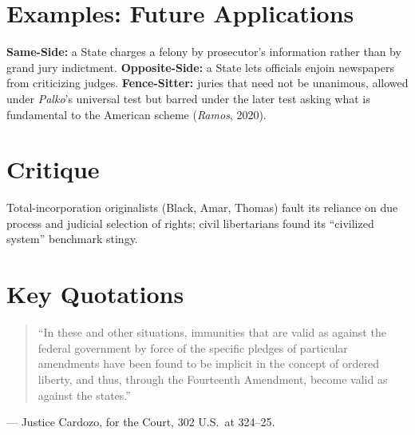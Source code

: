 \documentclass[12pt]{article}
\begin{document}
\section{Examples: Future Applications}
\textbf{Same-Side:} a State charges a felony by prosecutor's information rather than by grand jury indictment. \textbf{Opposite-Side:} a State lets officials enjoin newspapers from criticizing judges. \textbf{Fence-Sitter:} juries that need not be unanimous, allowed under \textit{Palko}'s universal test but barred under the later test asking what is fundamental to the American scheme (\textit{Ramos}, 2020).

\section{Critique}
Total-incorporation originalists (Black, Amar, Thomas) fault its reliance on due process and judicial selection of rights; civil libertarians found its ``civilized system'' benchmark stingy.

\section{Key Quotations}
\begin{quote}
``In these and other situations, immunities that are valid as against the federal government by force of the specific pledges of particular amendments have been found to be implicit in the concept of ordered liberty, and thus, through the Fourteenth Amendment, become valid as against the states.''
\end{quote}
\noindent --- Justice Cardozo, for the Court, 302 U.S.\ at 324--25.
\end{document}
